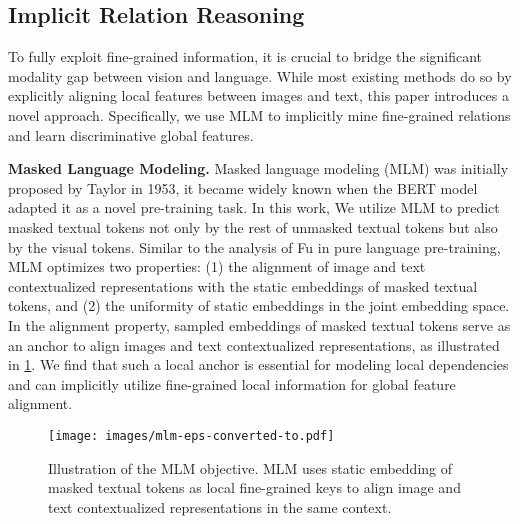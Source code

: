 \documentclass[10pt,twocolumn,letterpaper]{article}
\begin{document}
\subsection{Implicit Relation Reasoning}
To fully exploit fine-grained information, it is crucial to bridge the significant modality gap between vision and language.
While most existing methods do so by explicitly aligning local features between images and text, this paper introduces a novel approach. Specifically, we use MLM to implicitly mine fine-grained relations and learn discriminative global features. 


\textbf{Masked Language Modeling.} Masked language modeling (MLM) was initially proposed by Taylor\cite{taylor1953cloze} in 1953, it became widely known when the BERT model adapted it as a novel pre-training task. 
In this work, We utilize MLM to predict masked textual tokens not only by the rest of unmasked textual tokens but also by the visual tokens. 
Similar to the analysis of Fu \etal \cite{fu2022contextual} in pure language pre-training, MLM optimizes two properties: (1) the alignment of image and text contextualized representations with the static embeddings of masked textual tokens, and (2) the uniformity of static embeddings in the joint embedding space. In the alignment property, sampled embeddings of masked textual tokens serve as an anchor to align images and text contextualized representations, as illustrated in \cref{fig3}. We find that such a local anchor is essential for modeling local dependencies and can implicitly utilize fine-grained local information for global feature alignment.

\begin{figure}[ht]
  \centerline{\texttt{[image: images/mlm-eps-converted-to.pdf]}}
  \caption{Illustration of the MLM objective. MLM uses static embedding of masked textual tokens as local fine-grained keys to align image and text contextualized representations in the same context.}
  \label{fig3}
  \vspace{-3mm}
\end{figure}
\end{document}
